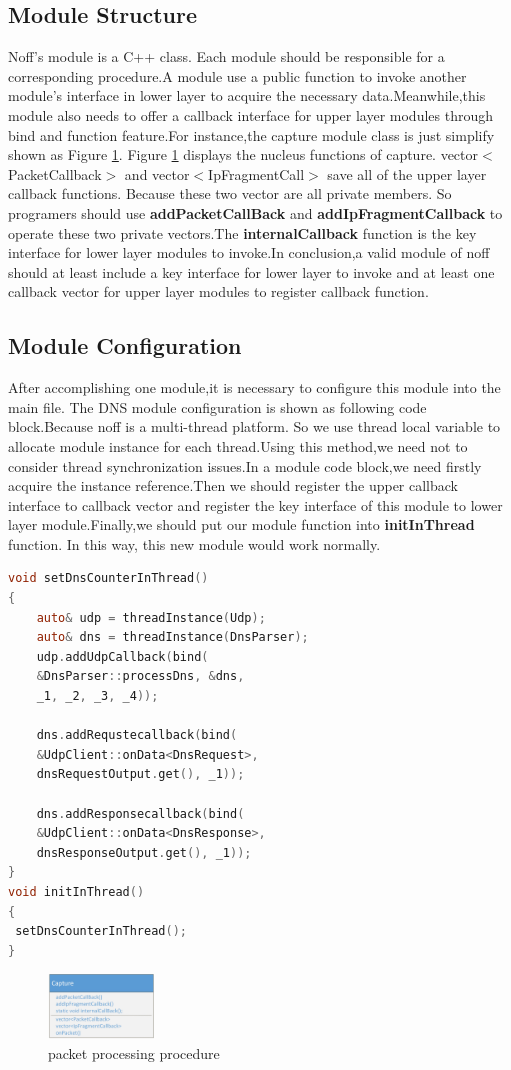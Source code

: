 \documentclass[conference]{IEEEtran}
\begin{document}
\subsection{Module Structure}
Noff's module is a C++ class. Each module should be responsible for a corresponding procedure.A module use a public function to invoke another module's interface in lower layer to acquire the necessary data.Meanwhile,this module also needs to offer a callback interface for upper layer modules through bind and function feature.For instance,the capture module class is just simplify shown as Figure \ref{fig:4}. \newline\indent Figure \ref{fig:4} displays the nucleus functions of capture. vector$<$PacketCallback$>$ and vector$<$IpFragmentCall$>$ save all of the upper layer callback functions. Because these two vector are all private members. So programers should use \textbf{addPacketCallBack} and \textbf{addIpFragmentCallback} to operate these two private vectors.The \textbf{internalCallback} function is the key interface for lower layer modules to invoke.In conclusion,a valid module of noff should at least include a key interface for lower layer to invoke and at least one callback vector for upper layer modules to register callback function.
\subsection{Module Configuration}
After accomplishing one module,it is necessary to configure this module into the main file. The DNS module configuration is shown as following code block.Because noff is a multi-thread platform. So we use thread local variable to allocate module instance for each thread.Using this method,we need not to consider thread synchronization issues.In a module code block,we need firstly acquire the instance reference.Then we 
should register the upper callback interface to callback vector and register the key interface of this module to lower layer module.Finally,we should put our module function into \textbf{initInThread} function. In this way, this new module would work normally.
\begin{lstlisting}[language=C]
void setDnsCounterInThread()
{
    auto& udp = threadInstance(Udp);
    auto& dns = threadInstance(DnsParser);
    udp.addUdpCallback(bind(
    &DnsParser::processDns, &dns, 
    _1, _2, _3, _4));

    dns.addRequstecallback(bind(
    &UdpClient::onData<DnsRequest>,
    dnsRequestOutput.get(), _1));

    dns.addResponsecallback(bind(
    &UdpClient::onData<DnsResponse>,
    dnsResponseOutput.get(), _1));
}
void initInThread()
{
 setDnsCounterInThread();
}
\end{lstlisting}
\begin{figure}[htbp]
  \centering
  \includegraphics[width=0.25\textwidth]{./picture/Figure4.jpg}
  \caption{packet processing procedure}
  \label{fig:4}
\end{figure}
\end{document}

